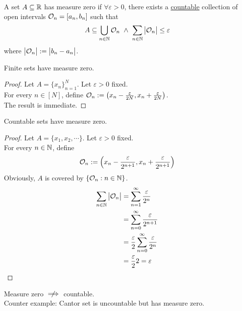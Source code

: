 \documentclass[11pt]{article}
\begin{document}
	\begin{definition}
		A set $A \subseteq \mathbb{R}$ has measure zero if $\forall \varepsilon > 0$, there exists a \ul{countable} collection of open intervals $\mathcal{{O}}_n = [a_n, b_n]$ such that 
		\begin{align}
			A \subseteq \bigcup_{n \in \N} \mc{O}_n\ \land \ \sum_{n\in\N}\abs{\mc{O}_n} \leq \varepsilon
		\end{align}
		where $\big \vert {\mathcal{{O}}_n} \big \vert := \big \vert {b_n - a_n} \big \vert$.
	\end{definition}
	
	\begin{proposition}
		Finite sets have measure zero.
	\end{proposition}
	
	\begin{proof}
		Let $A = \{x_n\}_{n=1}^N$. Let $\varepsilon > 0$ fixed. \\
		For every $n \in [N]$, define $\mathcal{{O}}_n := \left(x_n - \frac{\varepsilon}{2N}, x_n + \frac{\varepsilon}{2N} \right)$. \\
		The result is immediate.
	\end{proof}
	
	\begin{proposition}
		Countable sets have measure zero.
	\end{proposition}
	
	\begin{proof}
		Let $A = \{x_1, x_2, \cdots \}$. Let $\varepsilon > 0$ fixed. \\
		For every $n \in \mathbb{N}$, define
		\begin{align}
			\mathcal{{O}}_n := \left(
			x_n - \frac{\varepsilon}{2^{n+1}},
			x_n + \frac{\varepsilon}{2^{n+1}}
			\right)
		\end{align}
		Obviously, $A$ is covered by $\{\mathcal{{O}}_n:n\in\mathbb{N}\}$.
		\begin{align}
			\sum_{n\in\mathbb{N}} \big \vert {\mathcal{{O}}_n} \big \vert
			&= \sum_{n=1}^\infty \frac{\varepsilon}{2^n} \\
			&= \sum_{n=0}^\infty \frac{\varepsilon}{2^{n+1}} \\
			&= \frac{\varepsilon}{2} \sum_{n=0}^\infty \frac{\varepsilon}{2^n} \\
			&= \frac{\varepsilon}{2} 2 = \varepsilon
		\end{align}
	\end{proof}
	
	\begin{remark}
		Measure zero $\centernot \implies$ countable. \\
		Counter example: Cantor set is uncountable but has measure zero.
	\end{remark}
	
\end{document}
